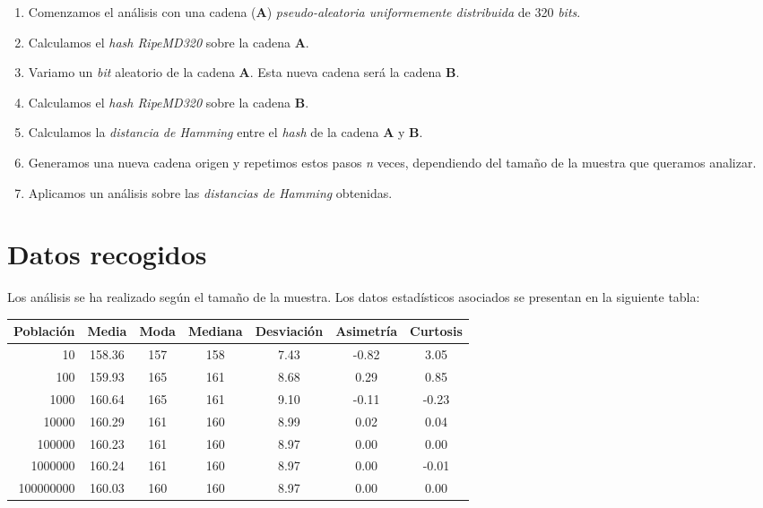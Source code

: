 \documentclass[11pt,a4paper]{article}
\begin{document}
\begin{enumerate}
\item Comenzamos el análisis con una cadena (\textbf{A}) \emph{pseudo-aleatoria
  uniformemente distribuida} de 320 \emph{bits}.
\item Calculamos el \emph{hash RipeMD320} sobre la cadena \textbf{A}.
\item Variamo un \emph{bit} aleatorio de la cadena \textbf{A}. Esta nueva
  cadena será la cadena \textbf{B}.
\item Calculamos el \emph{hash RipeMD320} sobre la cadena \textbf{B}.
\item Calculamos la \emph{distancia de Hamming} entre el \emph{hash}
  de la cadena \textbf{A} y \textbf{B}.
\item Generamos una nueva cadena origen y repetimos estos pasos
  \emph{n} veces, dependiendo del tamaño de la muestra que queramos
  analizar.
\item Aplicamos un análisis sobre las \emph{distancias de Hamming}
  obtenidas.
\end{enumerate}

\section{Datos recogidos}

Los análisis se ha realizado según el tamaño de la
muestra. Los datos estadísticos asociados se presentan en la siguiente
tabla:

\begin{center}
  \vspace{-15pt}
  \label{tab:medidas}
  \begin{tabular}[c]{| r | *{6}{c} |}
  \hline
  Población  & Media  & Moda & Mediana & Desviación & Asimetría & Curtosis \\ \hline
  10         & 158.36 & 157  & 158     & 7.43       & -0.82     & 3.05     \\
  100        & 159.93 & 165  & 161     & 8.68       & 0.29      & 0.85     \\
  1000       & 160.64 & 165  & 161     & 9.10       & -0.11     & -0.23    \\
  10000      & 160.29 & 161  & 160     & 8.99       & 0.02      & 0.04     \\
  100000     & 160.23 & 161  & 160     & 8.97       & 0.00      & 0.00     \\
  1000000    & 160.24 & 161  & 160     & 8.97       & 0.00      & -0.01    \\
  100000000  & 160.03 & 160  & 160     & 8.97       & 0.00      & 0.00     \\
  \hline
  \end{tabular}

\vspace{-10pt}
\end{center}
\end{document}
